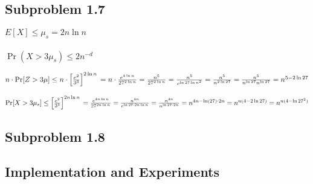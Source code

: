 \documentclass[article,a4paper,oneside]{memoir}
\newcommand{\+}[1]{\ensuremath{\boldsymbol{#1}}}
\begin{document}
\subsection{Subproblem 1.7}
$E[X] \leq \mu_s = 2n\ln n$
\\\\
$\Pr (X > 3\mu_s) \leq 2n^{-d}$

$n\cdot \Pr[Z>3\mu]\leq n\cdot \left [ \frac{e^2}{3^3} \right ]^{2\ln n}\\
=n\cdot\frac{e^{4\ln n}}{27^{2\ln n}}\\
=\frac{n^5}{27^{2\ln n}}\\
=\frac{n^5}{e^{\ln 27 \ln n^2}}\\
=\frac{n^5}{n^{2\ln 27}}\\
=\frac{n^5}{n^{\ln 27}n^{\ln 27}}\\
=n^{5-2\ln 27}$


$\Pr[X>3\mu_s]\leq \left [ \frac{e^2}{3^3} \right ]^{2n\ln n}\\
=\frac{e^{4n\ln n}}{27^{2n\ln n}}\\
=\frac{n^{4n}}{e^{\ln 27\cdot 2n\ln n}}\\
=\frac{n^{4n}}{n^{\ln 27\cdot 2n}}\\
=n^{4n-\ln(27)\cdot 2n}\\
=n^{n(4-2\ln 27)}\\
=n^{n(4-\ln 27^2)}$
\subsection{Subproblem 1.8}

\subsection{Implementation and Experiments}
\end{document}
